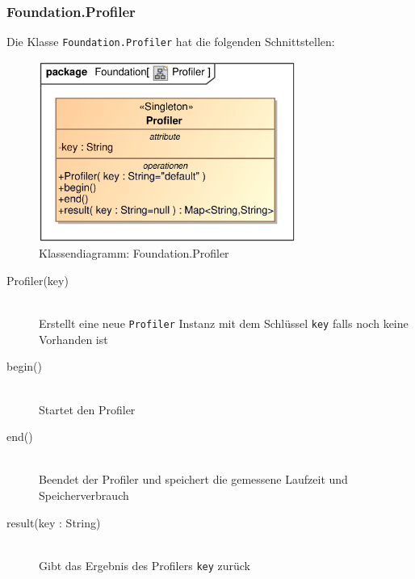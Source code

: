 \subsubsection{Foundation.Profiler}
Die Klasse \verb|Foundation.Profiler| hat die folgenden Schnittstellen:
\begin{figure}[H]
    \myfloatalign
    \includegraphics[width=0.75\textwidth]{gfx/MtGDeepAnalysis/Profiler.eps}
    \caption{Klassendiagramm: Foundation.Profiler}
    \label{fig:class:foundation.profiler}
\end{figure}
\begin{description}
    \item[Profiler(key)] \hfill \\
    Erstellt eine neue \verb|Profiler| Instanz mit dem Schlüssel \verb|key| falls noch keine Vorhanden ist
    
    \item[begin()] \hfill \\
    Startet den Profiler
    
    \item[end()] \hfill \\
    Beendet der Profiler und speichert die gemessene Laufzeit und Speicherverbrauch
    
    \item[result(key : String)] \hfill \\
    Gibt das Ergebnis des Profilers \verb|key| zurück
\end{description}

